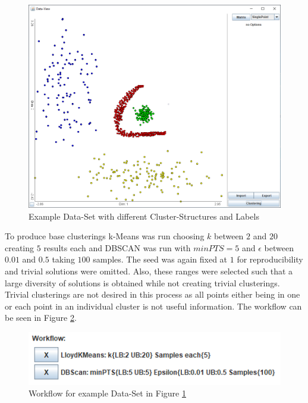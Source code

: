 \documentclass[
	a4paper,
	english,
	twoside,
	openright,               
	11pt                            
	]{report}
\begin{document}
\begin{figure}[h]
	\centering
	\includegraphics[scale=.5]{unob}
	\caption{Example Data-Set with different Cluster-Structures and Labels}
	\label{fig:unob}
\end{figure}

To produce base clusterings k-Means was run choosing $k$ between $2$ and $20$ creating $5$ results each and DBSCAN was run with $minPTS=5$ and $\epsilon$ between $0.01$ and $0.5$ taking $100$ samples. The seed was again fixed at $1$  for reproducibility and trivial solutions were omitted. Also, these ranges were selected such that a large diversity of solutions is obtained while not creating trivial clusterings. Trivial clusterings are not desired in this process as all points either being in one or each point in an individual cluster is not useful information. The workflow can be seen in Figure \ref{fig:unob_wf}.

\begin{figure}[h]
	\centering
	\includegraphics[scale=.75]{unob_wf}
	\caption{Workflow for example Data-Set in Figure \ref{fig:unob}}
	\label{fig:unob_wf}
\end{figure}
\end{document}
